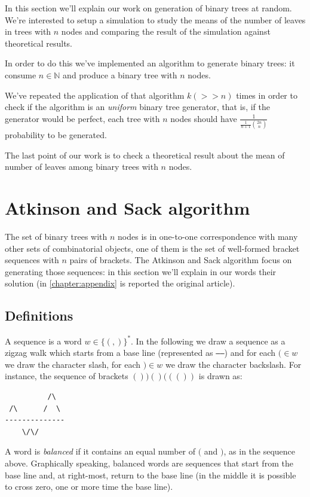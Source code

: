 In this section we'll explain our work on generation of binary trees
at random. We're interested to setup a simulation to study the means
of the number of leaves in trees with $n$ nodes and comparing the
result of the simulation against theoretical results.

In order to do this we've implemented an algorithm to generate binary
trees: it consume $n \in \mathbb{N} $ and produce a binary tree with
$n$ nodes.

We've repeated the application of that algorithm $k (>>
n)$ times in order to check if the algorithm is an \emph{uniform}
binary tree generator, that is, if the generator would be perfect,
each tree with $n$ nodes should have $ \frac{1}{
  \frac{1}{n+1}{{2n}\choose{n}} } $ probability to be generated.

The last point of our work is to check a theoretical result about the
mean of number of leaves among binary trees with $n$ nodes.


\section{Atkinson and Sack algorithm}
The set of binary trees with $n$ nodes is in one-to-one correspondence
with many other sets of combinatorial objects, one of them is the set
of well-formed bracket sequences with $n$ pairs of brackets. The
Atkinson and Sack algorithm focus on generating those sequences: in
this section we'll explain in our words their solution (in
\autoref{chapter:appendix} is reported the original article).

\subsection{Definitions}

A sequence is a word $w \in \{(,)\}^*$. In the following we draw a
sequence as a zigzag walk which starts from a base line (represented
as \texttt{-----}) and for each $( \in w$ we draw the character
slash, for each $) \in w$ we draw the character backslash. For
instance, the sequence of brackets $())()((())$ is drawn as:
\begin{verbatim}
          /\
 /\      /  \
--------------
    \/\/ 
\end{verbatim}
A word is \emph{balanced} if it contains an equal number of $($ and
$)$, as in the sequence above. Graphically speaking, balanced words
are sequences that start from the base line and, at right-most, return
to the base line (in the middle it is possible to cross zero, one or
more time the base line).\\

